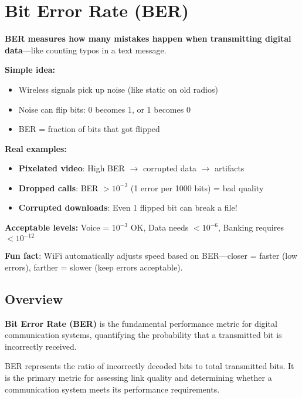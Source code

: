 \chapter{Bit Error Rate (BER)}
\label{ch:ber}

\begin{nontechnical}
\textbf{BER measures how many mistakes happen when transmitting digital data}---like counting typos in a text message.

\textbf{Simple idea:}
\begin{itemize}
\item Wireless signals pick up noise (like static on old radios)
\item Noise can flip bits: 0 becomes 1, or 1 becomes 0
\item BER = fraction of bits that got flipped
\end{itemize}

\textbf{Real examples:}
\begin{itemize}
\item \textbf{Pixelated video}: High BER $\rightarrow$ corrupted data $\rightarrow$ artifacts
\item \textbf{Dropped calls}: BER $> 10^{-3}$ (1 error per 1000 bits) = bad quality
\item \textbf{Corrupted downloads}: Even 1 flipped bit can break a file!
\end{itemize}

\textbf{Acceptable levels:} Voice = $10^{-3}$ OK, Data needs $< 10^{-6}$, Banking requires $< 10^{-12}$

\textbf{Fun fact}: WiFi automatically adjusts speed based on BER---closer = faster (low errors), farther = slower (keep errors acceptable).
\end{nontechnical}

\section{Overview}

\textbf{Bit Error Rate (BER)} is the fundamental performance metric for digital communication systems, quantifying the probability that a transmitted bit is incorrectly received.

\begin{keyconcept}
BER represents the ratio of incorrectly decoded bits to total transmitted bits. It is the primary metric for assessing link quality and determining whether a communication system meets its performance requirements.
\end{keyconcept}

